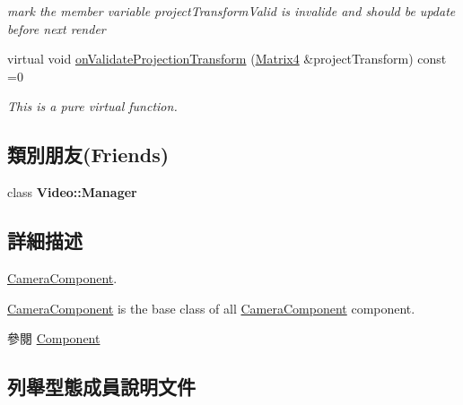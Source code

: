 \begin{DoxyCompactItemize}
\begin{DoxyCompactList}\small\item\em mark the member variable project\+Transform\+Valid is invalide and should be update before next render \end{DoxyCompactList}\item 
virtual void \hyperlink{class_i_dream_sky_1_1_camera_component_af788dca88e621066fe0700108ae4e856}{on\+Validate\+Projection\+Transform} (\hyperlink{class_i_dream_sky_1_1_matrix4}{Matrix4} \&project\+Transform) const  =0
\begin{DoxyCompactList}\small\item\em This is a pure virtual function. \end{DoxyCompactList}\end{DoxyCompactItemize}
\subsection*{類別朋友(Friends)}
\begin{DoxyCompactItemize}
\item 
class {\bfseries Video\+::\+Manager}\hypertarget{class_i_dream_sky_1_1_camera_component_a96cc6acb288ad905825c71c3a22a9c9f}{}\label{class_i_dream_sky_1_1_camera_component_a96cc6acb288ad905825c71c3a22a9c9f}

\end{DoxyCompactItemize}


\subsection{詳細描述}
\hyperlink{class_i_dream_sky_1_1_camera_component}{Camera\+Component}. 

\hyperlink{class_i_dream_sky_1_1_camera_component}{Camera\+Component} is the base class of all \hyperlink{class_i_dream_sky_1_1_camera_component}{Camera\+Component} component. \begin{DoxySeeAlso}{參閱}
\hyperlink{class_i_dream_sky_1_1_component}{Component} 
\end{DoxySeeAlso}


\subsection{列舉型態成員說明文件}
